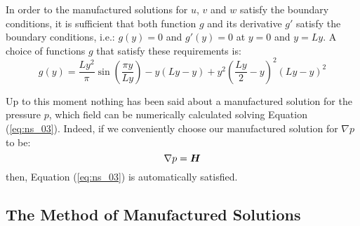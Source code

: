 \documentclass[10pt]{article}
\newcommand{\bv}[1]{\ensuremath{\mbox{\boldmath$ #1 $}}}
\begin{document}
% 

In order to the manufactured solutions for $u$, $v$ and $w$ satisfy the boundary conditions, it is sufficient that both function $g$ and its derivative $g'$ satisfy the boundary conditions, i.e.: $g(y)=0$ and $g'(y)=0$ at $y=0$ and $y=Ly$. A choice of functions $g$ that satisfy these requirements is:
\begin{equation}\label{eq:g}
g(y) = \dfrac{Ly^2}{\pi} \sin\left(\dfrac{\pi y}{Ly}\right)-y(Ly-y)+y^2 \left( \dfrac{Ly}{2}-y\right)^2(Ly-y)^2
\end{equation}

Up to this moment nothing has been said about a manufactured solution for the pressure $p$, which field can be numerically calculated solving Equation (\ref{eq:ns_03}). Indeed, if we conveniently choose our manufactured solution for $\nabla p$ to be:
\begin{equation}\label{eq:p}
 \nabla p = \bv{H}
\end{equation}
then, Equation (\ref{eq:ns_03}) is automatically satisfied.%

\subsection{The Method of Manufactured Solutions}
\end{document}
